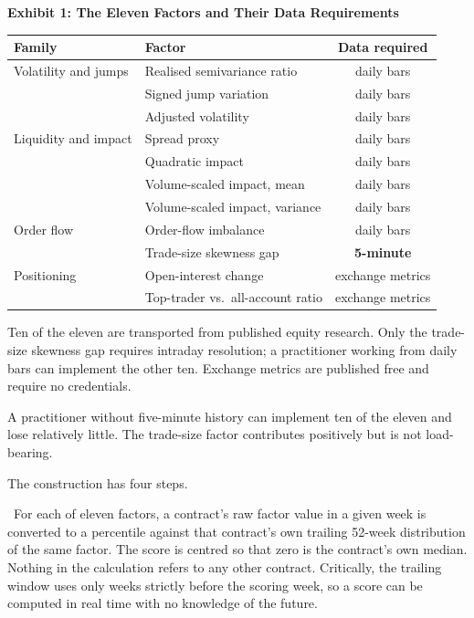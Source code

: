 \documentclass[12pt]{article}
\makeatletter
\renewcommand{\section}[1]{\par\vspace{16pt}%
  \noindent{\bfseries\MakeUppercase{#1}}\par\nobreak\vspace{4pt}%
  \@afterindenttrue\@afterheading}
\newcommand{\runin}[1]{\par\vspace{2pt}\noindent\hspace*{0.5in}{\bfseries #1}\ \ignorespaces}
\newenvironment{exhibit}[2]{%
  \par\vspace{14pt}\noindent\begin{minipage}{\textwidth}\centering\small
  \textbf{Exhibit #1: #2}\par\vspace{6pt}}%
  {\end{minipage}\par\vspace{12pt}}
\newcommand{\exnote}[1]{\par\vspace{4pt}%
  \begin{minipage}{0.88\textwidth}\fontsize{9}{11}\selectfont #1\end{minipage}}
\makeatother
\begin{document}
\begin{exhibit}{1}{The Eleven Factors and Their Data Requirements}
\begin{tabular}{llc}
\toprule
Family & Factor & Data required \\
\midrule
Volatility and jumps & Realised semivariance ratio & daily bars \\
 & Signed jump variation & daily bars \\
 & Adjusted volatility & daily bars \\
Liquidity and impact & Spread proxy & daily bars \\
 & Quadratic impact & daily bars \\
 & Volume-scaled impact, mean & daily bars \\
 & Volume-scaled impact, variance & daily bars \\
Order flow & Order-flow imbalance & daily bars \\
 & Trade-size skewness gap & \textbf{5-minute} \\
Positioning & Open-interest change & exchange metrics \\
 & Top-trader vs.\ all-account ratio & exchange metrics \\
\bottomrule
\end{tabular}
\exnote{Ten of the eleven are transported from published equity research. Only
the trade-size skewness gap requires intraday resolution; a practitioner working
from daily bars can implement the other ten. Exchange metrics are published
free and require no credentials.}
\end{exhibit}

A practitioner without five-minute history can implement ten of the eleven and
lose relatively little. The trade-size factor contributes positively but is not
load-bearing.

\section{The Strategy}

The construction has four steps.

\runin{Score each contract against its own past.}For each of eleven factors, a contract's raw factor value in a given week is
converted to a percentile against that contract's own trailing 52-week
distribution of the same factor. The score is centred so that zero is the
contract's own median. Nothing in the calculation refers to any other contract.
Critically, the trailing window uses only weeks strictly before the scoring week,
so a score can be computed in real time with no knowledge of the future.
\end{document}
